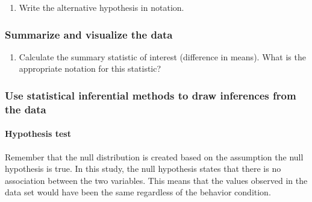 \documentclass[
]{report}
\providecommand{\tightlist}{%
  \setlength{\itemsep}{0pt}\setlength{\parskip}{0pt}}
\begin{document}
\vspace{1in}

\begin{enumerate}
\def\labelenumi{\arabic{enumi}.}
\setcounter{enumi}{7}
\tightlist
\item
  Write the alternative hypothesis in notation.
\end{enumerate}

\vspace{0.5in}

\hypertarget{summarize-and-visualize-the-data-4}{%
\subsubsection*{Summarize and visualize the data}\label{summarize-and-visualize-the-data-4}}

\begin{enumerate}
\def\labelenumi{\arabic{enumi}.}
\setcounter{enumi}{8}
\tightlist
\item
  Calculate the summary statistic of interest (difference in means). What is the appropriate notation for this statistic?
\end{enumerate}

\vspace{0.5in}

\hypertarget{use-statistical-inferential-methods-to-draw-inferences-from-the-data-3}{%
\subsubsection*{Use statistical inferential methods to draw inferences from the data}\label{use-statistical-inferential-methods-to-draw-inferences-from-the-data-3}}

\hypertarget{hypothesis-test-2}{%
\paragraph*{Hypothesis test}\label{hypothesis-test-2}}

Remember that the null distribution is created based on the assumption the null hypothesis is true. In this study, the null hypothesis states that there is no association between the two variables. This means that the values observed in the data set would have been the same regardless of the behavior condition.
\end{document}

